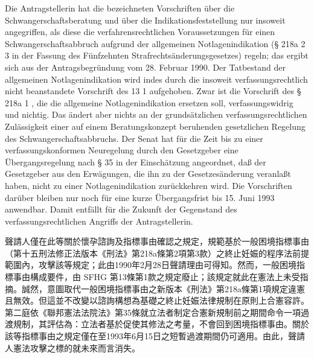\documentclass[12pt]{article}
\begin{document}
\begin{sourcepara}[title={原文E.260}]
Die Antragstellerin hat die bezeichneten Vorschriften über die Schwangerschaftsberatung und über die Indikationsfeststellung nur insoweit angegriffen, als diese die verfahrensrechtlichen Voraussetzungen für einen Schwangerschaftsabbruch aufgrund der allgemeinen Notlagenindikation (§ 218a \abbrAbs{} 2 \abbrNr{} 3 \abbrStGB{} in der Fassung des Fünfzehnten Strafrechtsänderungsgesetzes) regeln; das ergibt sich aus der Antragsbegründung vom 28. Februar 1990. Der Tatbestand der allgemeinen Notlagenindikation wird indes durch die insoweit verfassungsrechtlich nicht beanstandete Vorschrift des \abbrArt{} 13 \abbrNr{} 1 \abbrSFHG{} aufgehoben. Zwar ist die Vorschrift des § 218a \abbrAbs{} 1 \abbrStGB{} \abbrNF{}, die die allgemeine Notlagenindikation ersetzen soll, verfassungswidrig und nichtig. Das ändert aber nichts an der grundsätzlichen verfassungsrechtlichen Zulässigkeit einer auf einem Beratungskonzept beruhenden gesetzlichen Regelung des Schwangerschaftsabbruchs. Der Senat hat für die Zeit bis zu einer verfassungskonformen Neuregelung durch den Gesetzgeber eine Übergangsregelung nach § 35 \abbrBVerfGG{} in der Einschätzung angeordnet, daß der Gesetzgeber aus den Erwägungen, die ihn zu der Gesetzesänderung veranlaßt haben, nicht zu einer Notlagenindikation zurückkehren wird. Die Vorschriften darüber bleiben nur noch für eine kurze Übergangsfrist bis 15. Juni 1993 anwendbar. Damit entfällt für die Zukunft der Gegenstand des verfassungsrechtlichen Angriffs der Antragstellerin.
\end{sourcepara}
\begin{transpara}
聲請人僅在此等關於懷孕諮詢及指標事由確認之規定，規範基於一般困境指標事由（第十五刑法修正法版本《刑法》第218a條第2項第3款）之終止妊娠的程序法前提範圍內，攻擊該等規定；此由1990年2月28日聲請理由可得知。然而，一般困境指標事由構成要件，由 SFHG 第13條第1款之規定廢止；該規定就此在憲法上未受指摘。誠然，意圖取代一般困境指標事由之新版本《刑法》第218a條第1項規定違憲且無效。但這並不改變以諮詢構想為基礎之終止妊娠法律規制在原則上合憲容許。第二庭依《聯邦憲法法院法》第35條就立法者制定合憲新規制前之期間命令一項過渡規制，其評估為：立法者基於促使其修法之考量，不會回到困境指標事由。關於該等指標事由之規定僅在至1993年6月15日之短暫過渡期間仍可適用。由此，聲請人憲法攻擊之標的就未來而言消失。
\end{transpara}
\end{document}
